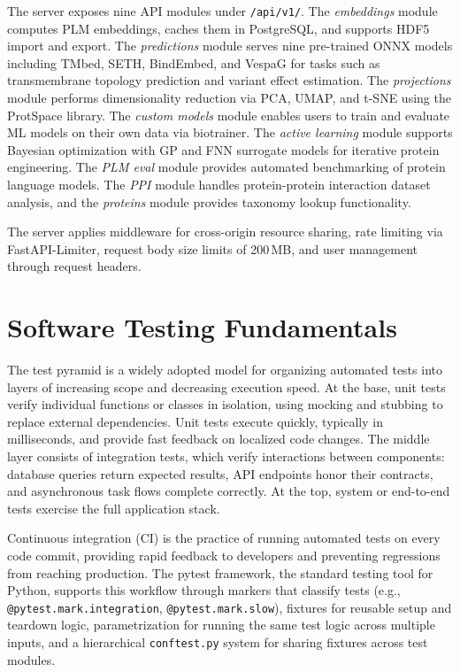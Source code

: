 The server exposes nine \ac{API} modules under \texttt{/api/v1/}. The \emph{embeddings} module computes \ac{PLM} embeddings, caches them in PostgreSQL, and supports HDF5 import and export. The \emph{predictions} module serves nine pre-trained \ac{ONNX} models including TMbed, SETH, BindEmbed, and VespaG for tasks such as transmembrane topology prediction and variant effect estimation. The \emph{projections} module performs dimensionality reduction via \ac{PCA}, \ac{UMAP}, and \ac{t-SNE} using the ProtSpace library. The \emph{custom models} module enables users to train and evaluate \ac{ML} models on their own data via biotrainer. The \emph{active learning} module supports Bayesian optimization with \ac{GP} and \ac{FNN} surrogate models for iterative protein engineering. The \emph{PLM eval} module provides automated benchmarking of protein language models. The \emph{PPI} module handles protein-protein interaction dataset analysis, and the \emph{proteins} module provides taxonomy lookup functionality.

The server applies middleware for cross-origin resource sharing, rate limiting via FastAPI-Limiter, request body size limits of 200\,MB, and user management through request headers.

\section{Software Testing Fundamentals}\label{sec:testing-fundamentals}

The test pyramid is a widely adopted model for organizing automated tests into layers of increasing scope and decreasing execution speed. At the base, unit tests verify individual functions or classes in isolation, using mocking and stubbing to replace external dependencies. Unit tests execute quickly, typically in milliseconds, and provide fast feedback on localized code changes. The middle layer consists of integration tests, which verify interactions between components: database queries return expected results, \ac{API} endpoints honor their contracts, and asynchronous task flows complete correctly. At the top, system or end-to-end tests exercise the full application stack.

Continuous integration (\ac{CI}) is the practice of running automated tests on every code commit, providing rapid feedback to developers and preventing regressions from reaching production. The pytest framework, the standard testing tool for Python, supports this workflow through markers that classify tests (e.g., \texttt{@pytest.mark.integration}, \texttt{@pytest.mark.slow}), fixtures for reusable setup and teardown logic, parametrization for running the same test logic across multiple inputs, and a hierarchical \texttt{conftest.py} system for sharing fixtures across test modules.

